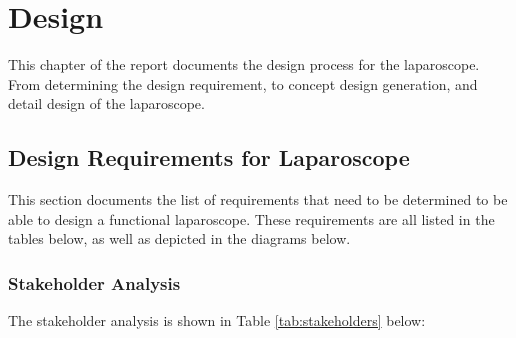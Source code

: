 \chapter{Design}
\label{sec:Design}

This chapter of the report documents the design process for the laparoscope. From determining the design requirement, to concept design generation, and detail design of the laparoscope.

\section{Design Requirements for Laparoscope}

This section documents the list of requirements that need to be determined to be able to design a functional laparoscope. These requirements are all listed in the tables below, as well as depicted  in the diagrams below. 

\subsection{Stakeholder Analysis}

The stakeholder analysis is shown in Table \ref{tab:stakeholders} below:

